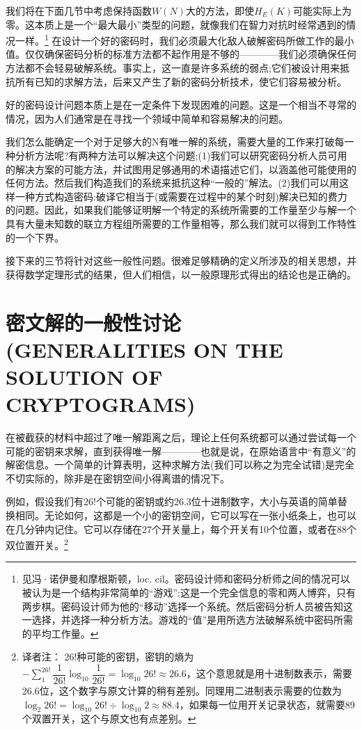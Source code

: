 \documentclass[]{article}
\begin{document}
我们将在下面几节中考虑保持函数$W(N)$大的方法，即使$H_E(K)$可能实际上为零。这本质上是一个“最大最小”类型的问题，就像我们在智力对抗时经常遇到的情况一样。\footnote{见冯·诺伊曼和摩根斯顿，loc. cil。密码设计师和密码分析师之间的情况可以被认为是一个结构非常简单的“游戏”;这是一个完全信息的零和两人博弈，只有两步棋。密码设计师为他的“移动”选择一个系统。然后密码分析人员被告知这一选择，并选择一种分析方法。游戏的“值”是用所选方法破解系统中密码所需的平均工作量。}
在设计一个好的密码时，我们必须最大化敌人破解密码所做工作的最小值。仅仅确保密码分析的标准方法都不起作用是不够的————我们必须确保任何方法都不会轻易破解系统。事实上，这一直是许多系统的弱点;它们被设计用来抵抗所有已知的求解方法，后来又产生了新的密码分析技术，使它们容易被分析。

好的密码设计问题本质上是在一定条件下发现困难的问题。这是一个相当不寻常的情况，因为人们通常是在寻找一个领域中简单和容易解决的问题。

我们怎么能确定一个对于足够大的N有唯一解的系统，需要大量的工作来打破每一种分析方法呢?有两种方法可以解决这个问题;(1)我们可以研究密码分析人员可用的解决方案的可能方法，并试图用足够通用的术语描述它们，以涵盖他可能使用的任何方法。然后我们构造我们的系统来抵抗这种“一般的”解法。(2)我们可以用这样一种方式构造密码:破译它相当于(或需要在过程中的某个时刻)解决已知的费力的问题。因此，如果我们能够证明解一个特定的系统所需要的工作量至少与解一个具有大量未知数的联立方程组所需要的工作量相等，那么我们就可以得到工作特性的一个下界。

接下来的三节将针对这些一般性问题。很难足够精确的定义所涉及的相关思想，并获得数学定理形式的结果，但人们相信，以一般原理形式得出的结论也是正确的。

\newpage
%   
%

\section{密文解的一般性讨论(GENERALITIES ON THE SOLUTION OF CRYPTOGRAMS)}

在被截获的材料中超过了唯一解距离之后，理论上任何系统都可以通过尝试每一个可能的密钥来求解，直到获得唯一解————也就是说，在原始语言中“有意义”的解密信息。一个简单的计算表明，这种求解方法(我们可以称之为完全试错)是完全不切实际的，除非是在密钥空间小得离谱的情况下。

例如，假设我们有26!个可能的密钥或约26.3位十进制数字，大小与英语的简单替换相同。无论如何，这都是一个小的密钥空间，它可以写在一张小纸条上，也可以在几分钟内记住。它可以存储在27个开关量上，每个开关有10个位置，或者在88个双位置开关。\footnote{译者注：
26!种可能的密钥，密钥的熵为$-\sum_{1}^{26!}{\dfrac{1}{26!}\log_{10}{\dfrac{1}{26!}}}=\log_10{26!}\approx 26.6$，这个意思就是用十进制数表示，需要26.6位，这个数字与原文计算的稍有差别。同理用二进制表示需要的位数为$\log_2{26!}=\log_{10}{26!}\div \log_{10}{2}\approx 88.4$，如果每一位用开关记录状态，就需要89个双置开关，这个与原文也有点差别。
}
\end{document}
